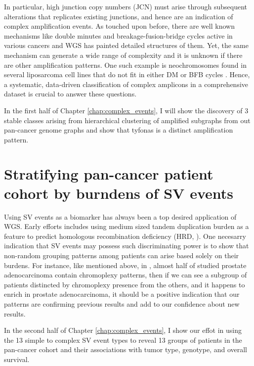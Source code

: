 \documentclass[phd,tocprelim]{cornell}
\begin{document}
In particular, high junction copy numbers (JCN) must arise through subsequent alterations that replicates existing junctions, and hence are an indication of complex amplification events. As touched upon before, there are well known mechanisms like double minutes and breakage-fusion-bridge cycles active in various cancers and WGS has painted detailed structures of them. Yet, the same mechanism can generate a wide range of complexity \cite{Deshpande2019-gs} and it is unknown if there are other amplification patterns. One such example is neochromosomes found in several liposarcoma cell lines that do not fit in either DM or BFB cycles \cite{garsed2014}. Hence, a systematic, data-driven classification of complex amplicons in a comprehensive dataset is crucial to answer these questions.

In the first half of Chapter \ref{chap:complex_events}, I will show the discovery of 3 stable classes arising from hierarchical clustering of amplified subgraphs from out pan-cancer genome graphs and show that tyfonas is a distinct amplification pattern.

\section{Stratifying pan-cancer patient cohort by burndens of SV events}
Using SV events as a biomarker has always been a top desired application of WGS. Early efforts includes using medium sized tandem duplication burden as a feature to predict homologous recombination deficiency (HRD, \cite{Davies:2017642}). One necesarry indication that SV events may possess such discriminating power is to show that non-random grouping patterns among patients can arise based solely on their burdens. For instance, like mentioned above, in \cite{baca2013}, almost half of studied prostate adenocarcinoma contain chromoplexy patterns, then if we can see a subgroup of patients distincted by chromoplexy presence from the others, and it happens to enrich in prostate adenocarcinoma, it should be a positive indication that our patterns are confirming previous results and add to our confidence about new results.

In the second half of Chapter \ref{chap:complex_events}, I show our effot in using the 13 simple to complex SV event types to reveal 13 groups of patients in the pan-cancer cohort and their associations with tumor type, genotype, and overall survival. 

\end{document}
